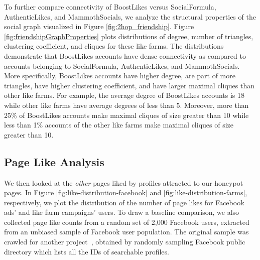 \documentclass[twocolumn,10pt,letterpaper]{article}
\begin{document}
To further compare connectivity of BoostLikes versus SocialFormula, AuthenticLikes, and MammothSocials, we analyze the structural properties of the social graph visualized in Figure \ref{fig:2hop_friendship}.
%
Figure \ref{fig:friendshipGraphProperties} plots distributions of degree, number of triangles, clustering coefficient, and cliques for these like farms.
%
The distributions demonstrate that BoostLikes accounts have dense connectivity as compared to accounts belonging to SocialFormula, AuthenticLikes, and MammothSocials.
%
More specifically, BoostLikes accounts have higher degree, are part of more triangles, have higher clustering coefficient, and have larger maximal cliques than other like farms.
%
For example, the average degree of BoostLikes accounts is 18 while other like farms have average degrees of less than 5.
%
Moreover, more than 25\% of BoostLikes accounts make maximal cliques of size greater than 10 while less than 1\% accounts of the other like farms make maximal cliques of size greater than 10.











\begin{figure*}[!t]
\centering

	

%
\caption{Structural properties of the graph of 2-hop relationships among likers of like farm campaigns.}
\label{fig:friendshipGraphProperties}
%
\end{figure*}



\subsection{Page Like Analysis}
\label{sec:likeAnalysis}
We then looked at the {\em other} pages liked by profiles attracted to our honeypot pages.
%
In Figure \ref{fig:like-distribution-facebook} and \ref{fig:like-distribution-farms}, respectively,
we plot the distribution of the number of page likes for Facebook ads' and like farm campaigns' users.
%
To draw a baseline comparison, we also collected page like counts from a random set of 2,000 Facebook users, extracted from an unbiased sample of Facebook user population. The original sample was crawled for another project~\cite{chen2013much}, obtained by randomly sampling Facebook public directory which lists all the IDs of searchable profiles.
\end{document}
